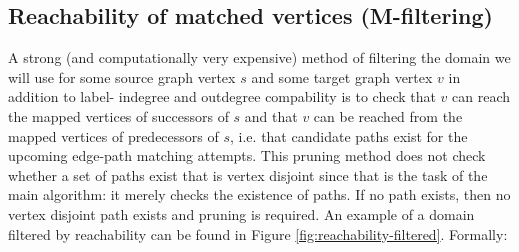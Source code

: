 \subsection{Reachability of matched vertices (M-filtering)}
A strong (and computationally very expensive) method of filtering the domain we will use for some source graph vertex $s$ and some target graph vertex $v$ in addition to label- indegree and outdegree compability is to check that $v$ can reach the mapped vertices of successors of $s$ and that $v$ can be reached from the mapped vertices of predecessors of $s$, i.e. that candidate paths exist for the upcoming edge-path matching attempts. This pruning method does not check whether a set of paths exist that is vertex disjoint since that is the task of the main algorithm: it merely checks the existence of paths. If no path exists, then no vertex disjoint path exists and pruning is required. An example of a domain filtered by reachability can be found in Figure \ref{fig:reachability-filtered}. Formally:

